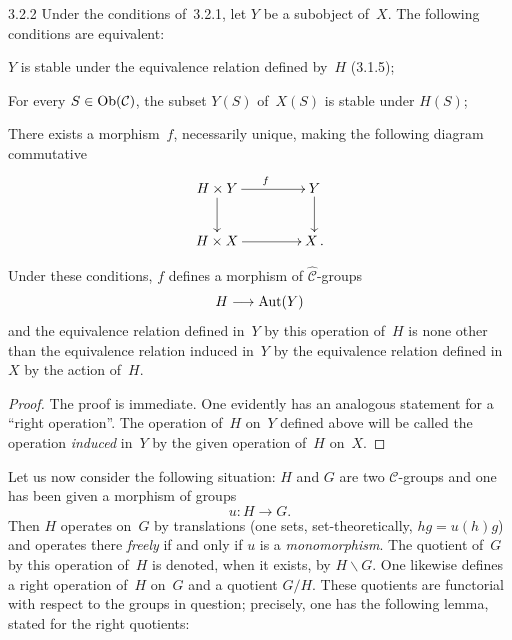 \begin{lemma}{3.2.2}
\label{IV.3.2.2}
Under the conditions of~3.2.1, let \(Y\) be a subobject of~\(X\). The
following conditions are equivalent:
\begin{enumeratei}
\item \(Y\) is stable under the equivalence relation defined by~\(H\)
(3.1.5);
\item For every \(S\in\operatorname{Ob}(\mathcal{C})\), the subset \(Y(S)\) of~\(X(S)\) is
stable under \(H(S)\);
\item There exists a morphism~\(f\), necessarily unique, making the following
diagram commutative
\[
\xymatrix@C=4.2em@R=2.4em{
H\times Y \ar[r]^{f} \ar[d]
  & Y \ar[d] \\
H\times X \ar[r]
  & X\,.
}
\]
\end{enumeratei}
Under these conditions, \(f\) defines a morphism of
\(\widehat{\mathcal{C}}\)-groups
\[
H\longrightarrow\operatorname{Aut}(Y)
\]
and the equivalence relation defined in~\(Y\) by this operation of~\(H\) is
none other than the equivalence relation induced in~\(Y\) by the equivalence
relation defined in~\(X\) by the action of~\(H\).
\end{lemma}

\begin{proof}
The proof is immediate. One evidently has an analogous statement for a
``right operation''. The operation of~\(H\) on~\(Y\) defined above will be
called the operation \emph{induced} in~\(Y\) by the given operation
of~\(H\) on~\(X\).
\end{proof}

Let us now consider the following situation: \(H\) and \(G\) are two
\(\mathcal{C}\)-groups and one has been given a morphism of groups
\[
u\colon H\longrightarrow G.
\]
Then \(H\) operates on~\(G\) by translations (one sets, set-theoretically,
\(hg=u(h)g\)) and operates there \emph{freely} if and only if \(u\) is a
\emph{monomorphism}. The quotient of~\(G\) by this operation of~\(H\) is
denoted, when it exists, by \(H\backslash G\). One likewise defines a right
operation of~\(H\) on~\(G\) and a quotient \(G/H\). These quotients are
functorial with respect to the groups in question; precisely, one has the
following lemma, stated for the right quotients:

